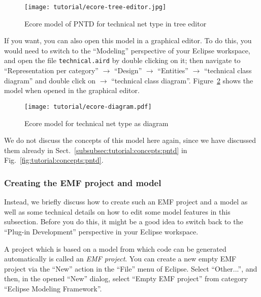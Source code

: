 \begin{figure}[hbtp!!]
  \centerline{\texttt{[image: tutorial/ecore-tree-editor.jpg]}}
  \caption{Ecore model of PNTD for technical net type in tree editor}
  \label{fig:tutorial:technical:pntd:ecore-tree}
\end{figure}

If you want, you can also open this model
in a graphical editor. To do this, you would need to switch to the ``Modeling''
perspective of your Eclipse workspace, and open the file {\tt technical.aird} by
double clicking on it; then navigate to ``Representation per category''
$\rightarrow$ ``Design'' $\rightarrow$ ``Entities'' $\rightarrow$ ``technical
class diagram'' and double click on $\rightarrow$ ``technical
class diagram''. Figure~\ref{fig:tutorial:technical:pntd:ecore-diagram} shows
the model when opened in the graphical editor.

\begin{figure}[hbtp!!]
  \centerline{\texttt{[image: tutorial/ecore-diagram.pdf]}}
  \caption{Ecore model for technical net type as diagram}
  \label{fig:tutorial:technical:pntd:ecore-diagram}
\end{figure}

We do not discuss the concepts of this model here again, since we
have discussed them already in Sect.~\ref{subsubsec:tutorial:concepts:pntd} in
Fig.~\ref{fig:tutorial:concepts:pntd}. 

\subsubsection{Creating the EMF project and model}
\label{subsec:tutorial:technical:pntd:ecore-creation}

Instead, we briefly discuss how to create such an EMF project and a model as
well as some technical details on how to edit some model features in this
subsection. Before you do this, it might be a good idea to switch back to
the ``Plug-in Development'' perspective in your Eclipse workspace.

A project which is based on a model from which code can be generated
automatically is called an \emph{EMF project}.  You can create a new empty
EMF project via the ``New'' action in the ``File'' menu of Eclipse. Select
``Other...'', and then, in the opened ``New'' dialog, select ``Empty EMF
project'' from category ``Eclipse Modeling Framework''.

